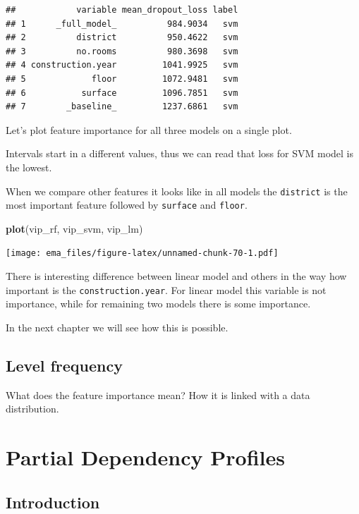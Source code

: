 \documentclass[12pt,]{krantz}
\newenvironment{Shaded}{\begin{snugshade}}{\end{snugshade}}
\newcommand{\KeywordTok}[1]{\textcolor[rgb]{0.13,0.29,0.53}{\textbf{#1}}}
\newcommand{\NormalTok}[1]{#1}
\begin{document}
\begin{verbatim}
##            variable mean_dropout_loss label
## 1      _full_model_          984.9034   svm
## 2          district          950.4622   svm
## 3          no.rooms          980.3698   svm
## 4 construction.year         1041.9925   svm
## 5             floor         1072.9481   svm
## 6           surface         1096.7851   svm
## 7        _baseline_         1237.6861   svm
\end{verbatim}

Let's plot feature importance for all three models on a single plot.

Intervals start in a different values, thus we can read that loss for SVM model is the lowest.

When we compare other features it looks like in all models the \texttt{district} is the most important feature followed by \texttt{surface} and \texttt{floor}.

\begin{Shaded}
\begin{Highlighting}[]
\KeywordTok{plot}\NormalTok{(vip_rf, vip_svm, vip_lm)}
\end{Highlighting}
\end{Shaded}

\texttt{[image: ema\_files/figure-latex/unnamed-chunk-70-1.pdf]}

There is interesting difference between linear model and others in the way how important is the \texttt{construction.year}. For linear model this variable is not importance, while for remaining two models there is some importance.

In the next chapter we will see how this is possible.

\hypertarget{level-frequency}{%
\subsection{Level frequency}\label{level-frequency}}

What does the feature importance mean? How it is linked with a data distribution.

\hypertarget{partialDependenceProfiles}{%
\section{Partial Dependency Profiles}\label{partialDependenceProfiles}}

\hypertarget{PDPIntro}{%
\subsection{Introduction}\label{PDPIntro}}
\end{document}
